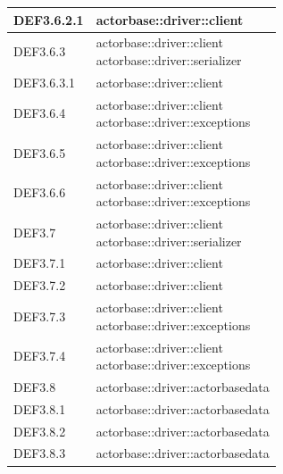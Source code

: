 \documentclass{scalatekids-article}
\begin{document}
\begin{longtable}[H]{|p{3.5cm}|p{7.5cm}|}
\hline
DEF3.6.2.1 & \multiLineCell[t]{actorbase::driver::client\\}\\
\hline
DEF3.6.3 & \multiLineCell[t]{actorbase::driver::client\\actorbase::driver::serializer\\}\\
\hline
DEF3.6.3.1 & \multiLineCell[t]{actorbase::driver::client\\}\\
\hline
DEF3.6.4 & \multiLineCell[t]{actorbase::driver::client\\actorbase::driver::exceptions\\}\\
\hline
DEF3.6.5 & \multiLineCell[t]{actorbase::driver::client\\actorbase::driver::exceptions\\}\\
\hline
DEF3.6.6 & \multiLineCell[t]{actorbase::driver::client\\actorbase::driver::exceptions\\}\\
\hline
DEF3.7 & \multiLineCell[t]{actorbase::driver::client\\actorbase::driver::serializer\\}\\
\hline
DEF3.7.1 & \multiLineCell[t]{actorbase::driver::client\\}\\
\hline
DEF3.7.2 & \multiLineCell[t]{actorbase::driver::client\\}\\
\hline
DEF3.7.3 & \multiLineCell[t]{actorbase::driver::client\\actorbase::driver::exceptions\\}\\
\hline
DEF3.7.4 & \multiLineCell[t]{actorbase::driver::client\\actorbase::driver::exceptions\\}\\
\hline
DEF3.8 & \multiLineCell[t]{actorbase::driver::actorbasedata\\}\\
\hline
DEF3.8.1 & \multiLineCell[t]{actorbase::driver::actorbasedata\\}\\
\hline
DEF3.8.2 & \multiLineCell[t]{actorbase::driver::actorbasedata\\}\\
\hline
DEF3.8.3 & \multiLineCell[t]{actorbase::driver::actorbasedata\\}\\

\end{longtable}
\end{document}
